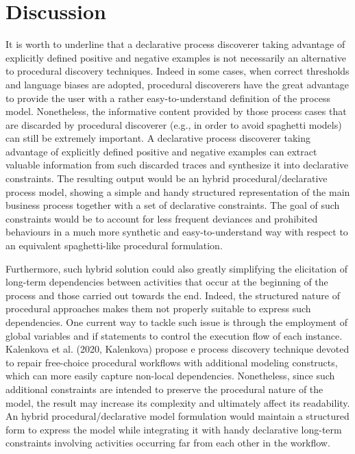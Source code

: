 
\section{Discussion}
\label{sec:discuss}

It is worth to underline that a declarative process discoverer taking advantage of explicitly defined positive and negative examples is not necessarily an alternative to procedural discovery techniques. 
Indeed in some cases, when correct thresholds and language biases are adopted, procedural discoverers have the great advantage to provide the user with a rather easy-to-understand definition of the process model. Nonetheless, the informative content provided by those process cases that are discarded by procedural discoverer (e.g., in order to avoid spaghetti models) can still be extremely important. 
A declarative process discoverer taking advantage of explicitly defined positive and negative examples can extract valuable information from such discarded traces and synthesize it into declarative constraints. The resulting output would be an hybrid procedural/declarative process model, showing a simple and handy structured representation of the main business process together with a set of declarative constraints. The goal of such constraints would be to account for less frequent deviances and prohibited behaviours in a much more synthetic and easy-to-understand way with respect to an equivalent spaghetti-like procedural formulation.

Furthermore, such hybrid solution could also greatly simplifying the elicitation of long-term dependencies between activities that occur at the beginning of the process and those carried out towards the end. Indeed, the structured nature of procedural approaches makes them not properly suitable to express such dependencies.
One current way to tackle such issue is through the employment of global variables and if statements to control the execution flow of each instance.
Kalenkova et al. (2020, Kalenkova)  propose e process discovery technique devoted to repair free-choice procedural workflows with additional modeling constructs, which can more easily capture non-local dependencies. Nonetheless, since such additional constraints are intended to preserve the procedural nature of the model, the result may increase its complexity and ultimately affect its readability.
An hybrid procedural/declarative model formulation would maintain a structured form to express the model while integrating it with handy declarative long-term constraints involving activities occurring far from each other in the workflow.


